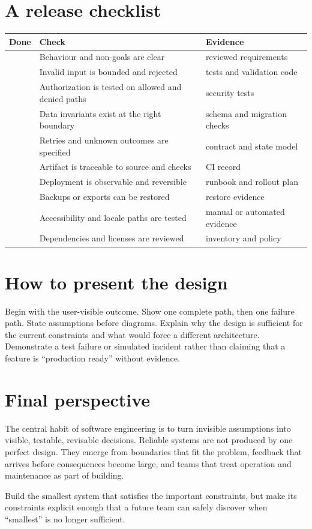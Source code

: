 \section{A release checklist}
\noindent\begin{longtable}{@{}p{}p{}p{}@{}}
\toprule
Done & Check & Evidence \\
\midrule
 & Behaviour and non-goals are clear & reviewed requirements \\
 & Invalid input is bounded and rejected & tests and validation code \\
 & Authorization is tested on allowed and denied paths & security tests \\
 & Data invariants exist at the right boundary & schema and migration checks \\
 & Retries and unknown outcomes are specified & contract and state model \\
 & Artifact is traceable to source and checks & CI record \\
 & Deployment is observable and reversible & runbook and rollout plan \\
 & Backups or exports can be restored & restore evidence \\
 & Accessibility and locale paths are tested & manual or automated evidence \\
 & Dependencies and licenses are reviewed & inventory and policy \\
\bottomrule
\end{longtable}

\section{How to present the design}
Begin with the user-visible outcome. Show one complete path, then one failure
path. State assumptions before diagrams. Explain why the design is sufficient
for the current constraints and what would force a different architecture.
Demonstrate a test failure or simulated incident rather than claiming that a
feature is “production ready” without evidence.

\section{Final perspective}
The central habit of software engineering is to turn invisible assumptions into
visible, testable, revisable decisions. Reliable systems are not produced by one
perfect design. They emerge from boundaries that fit the problem, feedback that
arrives before consequences become large, and teams that treat operation and
maintenance as part of building.

\begin{keyidea}
Build the smallest system that satisfies the important constraints, but make its
constraints explicit enough that a future team can safely discover when “smallest”
is no longer sufficient.
\end{keyidea}
